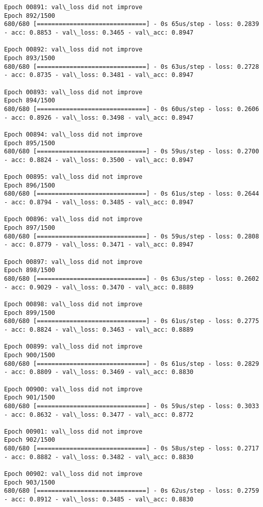 \documentclass[11pt]{article}
\begin{document}
\begin{Verbatim}[commandchars=\\\{\}]
Epoch 00891: val\_loss did not improve
Epoch 892/1500
680/680 [==============================] - 0s 65us/step - loss: 0.2839 - acc: 0.8853 - val\_loss: 0.3465 - val\_acc: 0.8947

Epoch 00892: val\_loss did not improve
Epoch 893/1500
680/680 [==============================] - 0s 63us/step - loss: 0.2728 - acc: 0.8735 - val\_loss: 0.3481 - val\_acc: 0.8947

Epoch 00893: val\_loss did not improve
Epoch 894/1500
680/680 [==============================] - 0s 60us/step - loss: 0.2606 - acc: 0.8926 - val\_loss: 0.3498 - val\_acc: 0.8947

Epoch 00894: val\_loss did not improve
Epoch 895/1500
680/680 [==============================] - 0s 59us/step - loss: 0.2700 - acc: 0.8824 - val\_loss: 0.3500 - val\_acc: 0.8947

Epoch 00895: val\_loss did not improve
Epoch 896/1500
680/680 [==============================] - 0s 61us/step - loss: 0.2644 - acc: 0.8794 - val\_loss: 0.3485 - val\_acc: 0.8947

Epoch 00896: val\_loss did not improve
Epoch 897/1500
680/680 [==============================] - 0s 59us/step - loss: 0.2808 - acc: 0.8779 - val\_loss: 0.3471 - val\_acc: 0.8947

Epoch 00897: val\_loss did not improve
Epoch 898/1500
680/680 [==============================] - 0s 63us/step - loss: 0.2602 - acc: 0.9029 - val\_loss: 0.3470 - val\_acc: 0.8889

Epoch 00898: val\_loss did not improve
Epoch 899/1500
680/680 [==============================] - 0s 61us/step - loss: 0.2775 - acc: 0.8824 - val\_loss: 0.3463 - val\_acc: 0.8889

Epoch 00899: val\_loss did not improve
Epoch 900/1500
680/680 [==============================] - 0s 61us/step - loss: 0.2829 - acc: 0.8809 - val\_loss: 0.3469 - val\_acc: 0.8830

Epoch 00900: val\_loss did not improve
Epoch 901/1500
680/680 [==============================] - 0s 59us/step - loss: 0.3033 - acc: 0.8632 - val\_loss: 0.3477 - val\_acc: 0.8772

Epoch 00901: val\_loss did not improve
Epoch 902/1500
680/680 [==============================] - 0s 58us/step - loss: 0.2717 - acc: 0.8882 - val\_loss: 0.3482 - val\_acc: 0.8830

Epoch 00902: val\_loss did not improve
Epoch 903/1500
680/680 [==============================] - 0s 62us/step - loss: 0.2759 - acc: 0.8912 - val\_loss: 0.3485 - val\_acc: 0.8830


\end{Verbatim}
\end{document}
